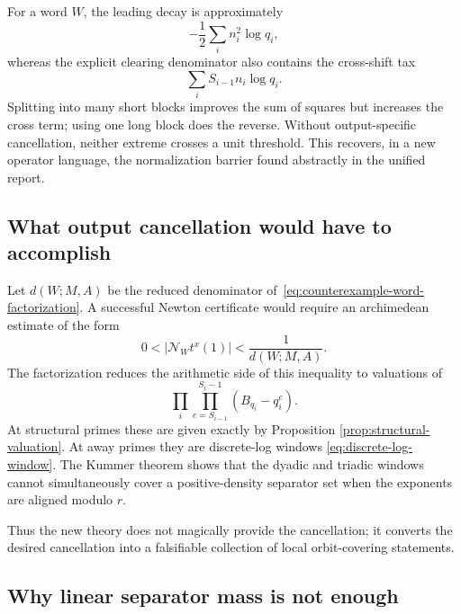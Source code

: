 \documentclass[11pt,oneside]{article}
\theoremstyle{definition}
\theoremstyle{remark}
\begin{document}
For a word $W$, the leading decay is approximately
\begin{equation}
 -\frac12\sum_i n_i^2\log q_i,
 \label{eq:word-decay}
\end{equation}
whereas the explicit clearing denominator also contains the cross-shift tax
\begin{equation}
 \sum_i S_{i-1}n_i\log q_i.
 \label{eq:word-shift-tax}
\end{equation}
Splitting into many short blocks improves the sum of squares but increases the cross term;
using one long block does the reverse.  Without output-specific cancellation, neither
extreme crosses a unit threshold.  This recovers, in a new operator language, the
normalization barrier found abstractly in the unified report.

\subsection{What output cancellation would have to accomplish}

Let $d(W;M,A)$ be the reduced denominator of~\eqref{eq:counterexample-word-factorization}.
A successful Newton certificate would require an archimedean estimate of the form
\begin{equation}
 0<|\mathcal N_Wt^x(1)|<\frac1{d(W;M,A)}.
 \label{eq:newton-unit-threshold}
\end{equation}
The factorization reduces the arithmetic side of this inequality to valuations of
\[
 \prod_i\prod_{e=S_{i-1}}^{S_i-1}(B_{q_i}-q_i^e).
\]
At structural primes these are given exactly by Proposition
\ref{prop:structural-valuation}.  At away primes they are discrete-log windows
\eqref{eq:discrete-log-window}.  The Kummer theorem shows that the dyadic and triadic windows
cannot simultaneously cover a positive-density separator set when the exponents are aligned
modulo $r$.

Thus the new theory does not magically provide the cancellation; it converts the desired
cancellation into a falsifiable collection of local orbit-covering statements.

\subsection{Why linear separator mass is not enough}
\end{document}
